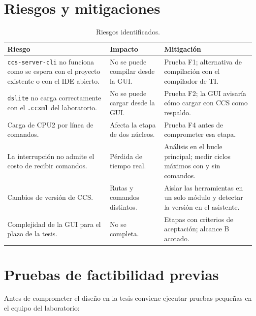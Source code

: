\documentclass[12pt,letterpaper]{article}
\begin{document}
\section{Riesgos y mitigaciones}
\label{sec:riesgos}

\begin{table}[!htbp]
\centering
\caption{Riesgos identificados.}
\label{tab:riesgos}
\begin{tabularx}{\textwidth}{>{\raggedright\arraybackslash}p{4.0cm}YY}
\toprule
\textbf{Riesgo} & \textbf{Impacto} & \textbf{Mitigación} \\
\midrule
\texttt{ccs-server-cli} no funciona como se espera con el proyecto existente o con el IDE abierto. & No se puede compilar desde la GUI. & Prueba F1; alternativa de compilación con el compilador de TI. \\
\texttt{dslite} no carga correctamente con el \texttt{.ccxml} del laboratorio. & No se puede cargar desde la GUI. & Prueba F2; la GUI avisaría cómo cargar con CCS como respaldo. \\
Carga de CPU2 por línea de comandos. & Afecta la etapa de dos núcleos. & Prueba F4 antes de comprometer esa etapa. \\
La interrupción no admite el costo de recibir comandos. & Pérdida de tiempo real. & Análisis en el bucle principal; medir ciclos máximos con y sin comandos. \\
Cambios de versión de CCS. & Rutas y comandos distintos. & Aislar las herramientas en un solo módulo y detectar la versión en el asistente. \\
Complejidad de la GUI para el plazo de la tesis. & No se completa. & Etapas con criterios de aceptación; alcance B acotado. \\
\bottomrule
\end{tabularx}
\end{table}

\section{Pruebas de factibilidad previas}
\label{sec:factibilidad}

Antes de comprometer el diseño en la tesis conviene ejecutar pruebas pequeñas en el equipo del laboratorio:
\end{document}
